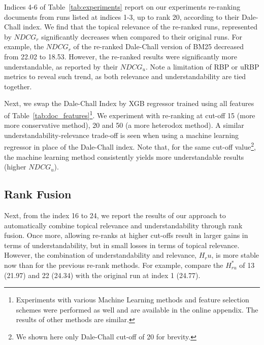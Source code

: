 Indices 4-6 of Table~\ref{tab:experiments} report on our experiments re-ranking documents from runs listed at indices 1-3, up to rank 20, according to their Dale-Chall index.
We find that the topical relevance of the re-ranked runs, represented by $NDCG_r$ significantly decreases when compared to their original runs. For example, the $NDCG_r$ of the re-ranked Dale-Chall version of BM25 decreased from 22.02 to 18.53. However, the re-ranked results were significantly more understandable, as reported by their $NDCG_u$. 
Note a limitation of RBP or uRBP metrics to reveal such trend, as both relevance and understandability are tied together.

Next, we swap the Dale-Chall Index by XGB regressor trained using all features of Table~\ref{tab:doc_features}\footnote{Experiments with various Machine Learning methods and feature selection schemes were performed as well and are available in the online appendix. The results of other methods are similar.}. %
We experiment with re-ranking at cut-off 15 (more more conservative method), 20 and 50 (a more heterodox method). 
A similar understandability-relevance trade-off is seen when using a machine learning regressor in place of the Dale-Chall index.
Note that, for the same cut-off value\footnote{We shown here only Dale-Chall cut-off of 20 for brevity.}, the machine learning method consistently yields more understandable results (higher $NDCG_u$). 

\subsection{Rank Fusion}
\label{results:fusion}

Next, from the index 16 to 24, we report the results of our approach to automatically combine topical relevance and understandability through rank fusion.
Once more, allowing re-ranks at higher cut-offs result in larger gains in terms of understandability, but in small losses in terms of topical relevance.
However, the combination of understandability and relevance, $H_ru$, is more stable now than for the previous re-rank methods. 
For example, compare the $H_{ru}^*$ of 13 (21.97) and 22 (24.34) with the original run at index 1 (24.77).

